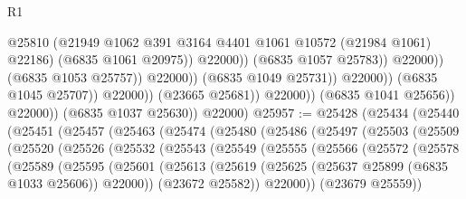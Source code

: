 \begin{lexlean}{R1}
\begin{coremodule}
                                                  @25810
                                                  (@21949
                                                    @1062
                                                    @391
                                                    @3164
                                                    @4401
                                                    @1061
                                                    @10572
                                                    (@21984 @1061)
                                                    @22186)
                                                  (@6835 @1061 @20975))
                                                @22000))
                                            (@6835 @1057 @25783))
                                          @22000))
                                      (@6835 @1053 @25757))
                                    @22000))
                                (@6835 @1049 @25731))
                              @22000))
                          (@6835 @1045 @25707))
                        @22000))
                    (@23665 @25681))
                  @22000))
              (@6835 @1041 @25656))
            @22000))
        (@6835 @1037 @25630))
      @22000)
@25957 := @25428
    (@25434
      (@25440
        (@25451
          (@25457
            (@25463
              (@25474
                (@25480
                  (@25486
                    (@25497
                      (@25503
                        (@25509
                          (@25520
                            (@25526
                              (@25532
                                (@25543
                                  (@25549
                                    (@25555
                                      (@25566
                                        (@25572
                                          (@25578
                                            (@25589
                                              (@25595
                                                (@25601
                                                  (@25613
                                                    (@25619
                                                      (@25625
                                                        (@25637 @25899 (@6835 @1033 @25606))
                                                        @22000))
                                                    (@23672 @25582))
                                                  @22000))
                                              (@23679 @25559))

\end{coremodule}
\end{lexlean}
